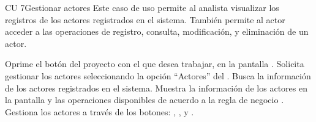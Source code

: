 \begin{UseCase}{CU 7}{Gestionar actores}
	{
		Este caso de uso permite al analista visualizar los registros de los actores registrados en el sistema. También permite 
		al actor acceder a las operaciones de registro, consulta, modificación, 
		y eliminación de un actor.
	}
	
	

	


\end{UseCase}
 \begin{UCtrayectoria}
	\UCpaso[\UCactor] Oprime el botón \btnEntrar del proyecto con el que desea trabajar, en la pantalla .
    \UCpaso[\UCactor] Solicita gestionar los actores seleccionando la opción ``Actores'' del .
    \UCpaso[\UCsist] Busca la información de los actores registrados en el sistema. 
    \UCpaso[\UCsist] Muestra la información de los actores en la pantalla  y las operaciones 
    disponibles de acuerdo a la regla de negocio . 
    \UCpaso[\UCactor] Gestiona los actores a través de los botones: , \btnConsulta, \btnEditar y \btnEliminar. \label{cu7:gestiona}
 \end{UCtrayectoria}
 

